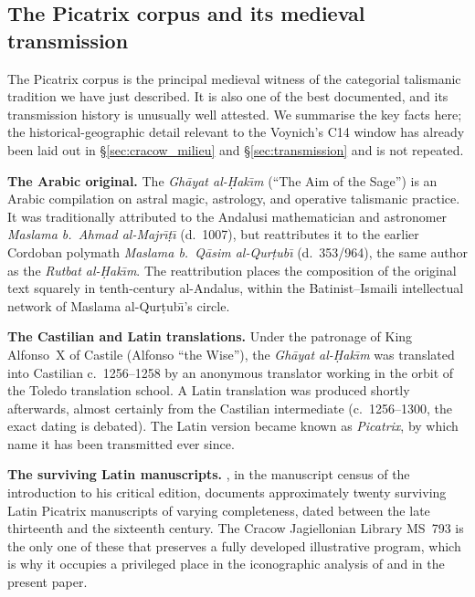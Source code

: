 \subsection{The Picatrix corpus and its medieval transmission}
\label{sec:picatrix_corpus}

The Picatrix corpus is the principal medieval witness of the categorial
talismanic tradition we have just described. It is also one of the
best documented, and its transmission history is unusually well
attested. We summarise the key facts here; the historical-geographic
detail relevant to the Voynich's C14 window has already been laid out
in \S\ref{sec:cracow_milieu} and \S\ref{sec:transmission} and is not
repeated.

\noindent\textbf{The Arabic original.} The
\textit{Gh\=ayat al-\d{H}ak\={\i}m} (``The Aim of the Sage'') is an
Arabic compilation on astral magic, astrology, and operative talismanic
practice. It was traditionally attributed to the Andalusi mathematician
and astronomer \textit{Maslama b.~Ahmad al-Majr\={\i}\d{t}\={\i}}
(d.~1007), but \citet{fierro1996} reattributes it to the earlier
Cordoban polymath \textit{Maslama b.~Q\=asim al-Qur\d{t}ub\={\i}}
(d.~353/964), the same author as the \textit{Rutbat al-\d{H}ak\={\i}m}.
The reattribution places the composition of the original text squarely
in tenth-century al-Andalus, within the Batinist--Ismaili intellectual
network of Maslama al-Qur\d{t}ub\={\i}'s circle.

\noindent\textbf{The Castilian and Latin translations.} Under the
patronage of King Alfonso~X of Castile (Alfonso ``the Wise''), the
\textit{Gh\=ayat al-\d{H}ak\={\i}m} was translated into Castilian
c.~1256--1258 by an anonymous translator working in the orbit of the
Toledo translation school. A Latin translation was produced shortly
afterwards, almost certainly from the Castilian intermediate
(c.~1256--1300, the exact dating is debated). The Latin version
became known as \textit{Picatrix}, by which name it has been
transmitted ever since.

\noindent\textbf{The surviving Latin manuscripts.} \citet{pingree1986},
in the manuscript census of the introduction to his critical edition,
documents approximately twenty surviving Latin Picatrix manuscripts
of varying completeness, dated between the late thirteenth and the
sixteenth century. The Cracow Jagiellonian Library MS~793 is the only
one of these that preserves a fully developed illustrative program,
which is why it occupies a privileged place in the iconographic
analysis of \citet{sniezynska2009} and in the present paper.

